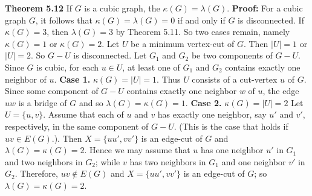 \nopagenumbers
{\bf Theorem 5.12}
\vskip 6pt
If $G$ is a cubic graph, the $\kappa (G)= \lambda (G)$.
\vskip 10pt
{\bf Proof:}
\vskip 6pt
For a cubic graph $G$, it follows that $\kappa (G)= \lambda (G) = 0$ if and only if $G$ is disconnected. If $\kappa (G)=3$, then $\lambda (G)=3$ by Theorem 5.11. So two cases remain, namely $\kappa (G)=1$ or $\kappa (G)=2$. Let $U$ be a minimum vertex-cut of $G$. Then $|U|=1$ or $|U|=2$. So $G-U$ is disconnected. Let $G_1$ and $G_2$ be two components of $G-U$. Since $G$ is cubic, for each $u \in U$, at least one of $G_1$ and $G_2$ contains exactly one neighbor of $u$.
\vskip 1mm
{\bf Case 1.} $\kappa (G)=|U|=1$. Thus $U$ consists of a cut-vertex $u$ of $G$. Since some component of $G-U$ contains exactly one neighbor $w$ of $u$, the edge $uw$ is a bridge of $G$ and so $\lambda (G)= \kappa (G)=1$.
\vskip 1mm
{\bf Case 2.} $\kappa (G)=|U|=2$ Let $U= \lbrace u,v \rbrace $. Assume that each of $u$ and $v$ has exactly one neighbor, say $u'$ and $v'$, respectively, in the same component of $G-U$. (This is the case that holds if $uv \in E(G)$.). Then $X= \lbrace uu',vv' \rbrace$ is an edge-cut of $G$ and $\lambda (G)= \kappa (G)=2$.
\vskip 1mm
Hence we may assume that $u$ has one neighbor $u'$ in $G_1$ and two neighbors in $G_2$; while $v$ has two neighbors in $G_1$ and one neighbor $v'$ in $G_2$. Therefore, $uv \not\in E(G)$ and $X= \lbrace uu',vv' \rbrace$ is an edge-cut of $G$; so $\lambda (G)= \kappa(G)=2$.

\vfill\eject
